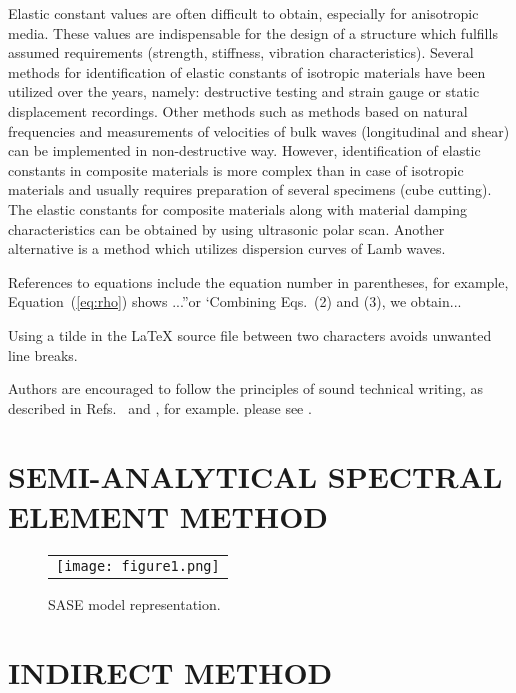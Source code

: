\documentclass[]{spie}  %
\begin{document}
Elastic constant values are often difficult to obtain, especially for anisotropic media.
These values are indispensable for the design of a structure which fulfills assumed 
requirements (strength, stiffness, vibration characteristics). 
Several methods for identification of elastic constants of isotropic materials have been 
utilized over the years, namely: destructive testing and strain gauge or static 
displacement recordings. 
Other methods such as methods based on natural frequencies and measurements of 
velocities of bulk waves (longitudinal and shear) can be implemented in non-destructive 
way. 
However, identification of elastic constants in composite materials is more complex 
than in case of isotropic materials and usually requires preparation of several 
specimens (cube cutting).
The elastic constants for composite materials along with material damping 
characteristics can be obtained by using ultrasonic polar scan.
Another alternative is a method which utilizes dispersion 
curves of Lamb waves.

References to equations include the equation number in parentheses, for example, 
Equation~(\ref{eq:rho}) shows ...''or `Combining Eqs.~(2) and (3), we obtain...

 Using a tilde in the LaTeX source file between two characters avoids unwanted line breaks.

Authors are encouraged to follow the principles of sound technical writing, as described 
in Refs.~ and , for example.
please see . 

\section{SEMI-ANALYTICAL SPECTRAL ELEMENT METHOD}
\label{sec:sase}

\begin{figure} [ht]
	\begin{center}
		\begin{tabular}{c} %
			\texttt{[image: figure1.png]}
		\end{tabular}
	\end{center}
	\caption[] 
	{ \label{fig:sase} 
		SASE model representation.}
\end{figure} 

\section{INDIRECT METHOD}
\label{sec:indirect}
\end{document}
